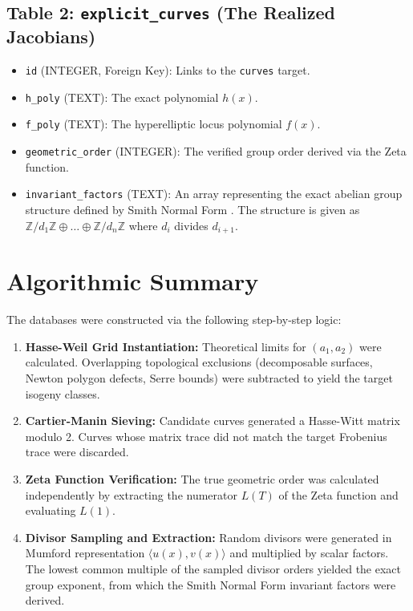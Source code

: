 \documentclass[12pt]{article}
\begin{document}
\subsection{Table 2: \texttt{explicit\_curves} (The Realized Jacobians)}
\begin{itemize}
    \item \texttt{id} (INTEGER, Foreign Key): Links to the \texttt{curves} target.
    \item \texttt{h\_poly} (TEXT): The exact polynomial $h(x)$.
    \item \texttt{f\_poly} (TEXT): The hyperelliptic locus polynomial $f(x)$.
    \item \texttt{geometric\_order} (INTEGER): The verified group order derived via the Zeta function.
    \item \texttt{invariant\_factors} (TEXT): An array representing the exact abelian group structure defined by Smith Normal Form \cite{Smith1861}. The structure is given as $\mathbb{Z}/d_1\mathbb{Z} \oplus \dots \oplus \mathbb{Z}/d_n\mathbb{Z}$ where $d_i$ divides $d_{i+1}$.
\end{itemize}

\section{Algorithmic Summary}
The databases were constructed via the following step-by-step logic:
\begin{enumerate}
    \item \textbf{Hasse-Weil Grid Instantiation:} Theoretical limits for $(a_1, a_2)$ were calculated. Overlapping topological exclusions (decomposable surfaces, Newton polygon defects, Serre bounds) were subtracted to yield the target isogeny classes.
    \item \textbf{Cartier-Manin Sieving:} Candidate curves generated a Hasse-Witt matrix modulo 2. Curves whose matrix trace did not match the target Frobenius trace were discarded.
    \item \textbf{Zeta Function Verification:} The true geometric order was calculated independently by extracting the numerator $L(T)$ of the Zeta function and evaluating $L(1)$. 
    \item \textbf{Divisor Sampling and Extraction:} Random divisors were generated in Mumford representation $\langle u(x), v(x) \rangle$ and multiplied by scalar factors. The lowest common multiple of the sampled divisor orders yielded the exact group exponent, from which the Smith Normal Form invariant factors were derived. 
\end{enumerate}
\end{document}
